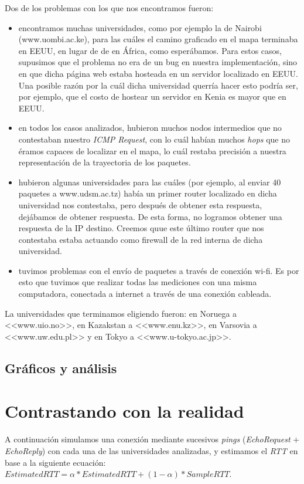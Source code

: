 \documentclass[final,inline,a4paper,narroweqnarray]{ieee}
\let\Oldsection\section
\renewcommand{\section}{\FloatBarrier\Oldsection}
\let\Oldsubsection\subsection
\renewcommand{\subsection}{\FloatBarrier\Oldsubsection}
\begin{document}
Dos de los problemas con los que nos encontramos fueron:
\begin{itemize}
	\item encontramos muchas universidades, como por ejemplo la de Nairobi (www.uombi.ac.ke), 
	para las cuáles el camino graficado en el mapa terminaba en EEUU, en lugar de de en África, 
	como esperábamos. Para estos
	casos, supusimos que el problema no era de un bug en nuestra implementación, sino en que
	dicha página web estaba hosteada
	en un servidor localizado en EEUU. Una posible razón por la cuál dicha universidad 
	querría hacer esto podría ser, por 
	ejemplo, que el costo de hostear un servidor en Kenia es mayor que en EEUU.
	\item en todos los casos analizados, hubieron muchos nodos intermedios que no 
	contestaban nuestro \emph{ICMP Request}, con
	lo cuál habían muchos \emph{hops} que no éramos capaces de localizar en el mapa, 
	lo cuál restaba precisión a nuestra 
	representación de la trayectoria de los paquetes.
	\item hubieron algunas universidades para las cuáles (por ejemplo, al enviar
	40 paquetes a www.udsm.ac.tz) había un primer router localizado en dicha universidad  
	nos contestaba, pero
	después de obtener esta respuesta, dejábamos de obtener respuesta. De esta forma, no 
	logramos obtener una respuesta de la IP destino. Creemos quue este 
	último router que nos contestaba estaba actuando como firewall de la red interna
	de dicha universidad.
	\item tuvimos problemas con el envío de paquetes a través de conexión wi-fi. Es por 
	esto que tuvimos que realizar todas las mediciones con una misma computadora, 
	conectada a internet a través de una conexión cableada.
\end{itemize}

La universidades que terminamos eligiendo fueron: en Noruega a <<www.uio.no>>, en Kazakstan a
 <<www.enu.kz>>, en Varsovia a <<www.uw.edu.pl>> y en Tokyo a <<www.u-tokyo.ac.jp>>.

\subsection{Gráficos y análisis}

\section{Contrastando con la realidad}
A continuación simulamos una conexión mediante sucesivos \emph{pings} (\emph{EchoRequest} $+$ \emph{EchoReply}) con cada una de las universidades analizadas, y estimamos el \emph{RTT} en base a la siguiente ecuación: $ EstimatedRTT = \alpha * EstimatedRTT + (1 - \alpha) * SampleRTT $. 
\end{document}
